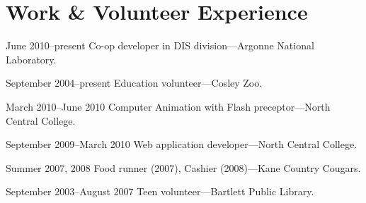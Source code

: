 \documentclass{simplecv}
\begin{document}
  \section{Work \& Volunteer Experience}
  \begin{topic}
    \item[June 2010--present] Co-op developer in DIS division---Argonne National Laboratory.
    \item[September 2004--present] Education volunteer---Cosley Zoo.
    \item[March 2010--June 2010] Computer Animation with Flash preceptor---North Central College.
    \item[September 2009--March 2010] Web application developer---North Central College.
    \item[Summer 2007, 2008] Food runner (2007), Cashier (2008)---Kane Country Cougars.
    \item[September 2003--August 2007] Teen volunteer---Bartlett Public Library.
  \end{topic}
\end{document}
